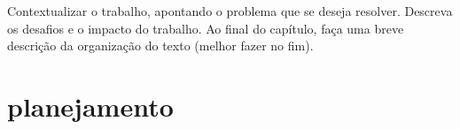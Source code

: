 \documentclass[../modelo.tex]{subfiles}
\begin{document}
Contextualizar o trabalho, apontando o problema que se deseja resolver. Descreva os desafios e o impacto do trabalho. Ao final do capítulo, faça uma breve descrição da organização do texto (melhor fazer no fim).

\section{planejamento}
\end{document}
